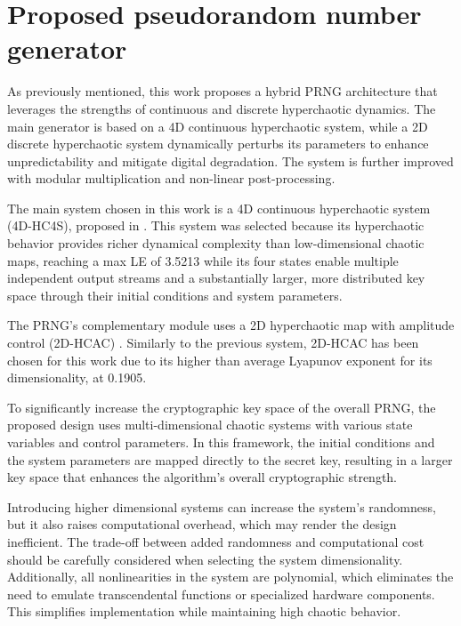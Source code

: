\documentclass[preprint, 12pt, sort&compress]{elsarticle}
\begin{document}
\section{Proposed pseudorandom number generator}\label{sec_3}
As previously mentioned, this work proposes a hybrid PRNG architecture that leverages the strengths of continuous and discrete hyperchaotic dynamics. The main generator is based on a 4D continuous hyperchaotic system, while a 2D discrete hyperchaotic system dynamically perturbs its parameters to enhance unpredictability and mitigate digital degradation. The system is further improved with modular multiplication and non-linear post-processing.

{\color{red}
The main system chosen in this work is a 4D continuous hyperchaotic system (4D-HC4S), proposed in \cite{vaidyanathan_new_2021}.
This system was selected because its hyperchaotic behavior provides richer dynamical complexity than low-dimensional chaotic maps, reaching a max LE of 3.5213 while its four states enable multiple independent output streams and a substantially larger, more distributed key space through their initial conditions and system parameters. 

The PRNG's complementary module uses a 2D hyperchaotic map with amplitude control (2D-HCAC) \cite{zhou_2d_2021}.
Similarly to the previous system, 2D-HCAC has been chosen for this work due to its higher than average Lyapunov exponent for its dimensionality, at 0.1905. 

To significantly increase the cryptographic key space of the overall PRNG, the proposed design uses multi-dimensional chaotic systems with various state variables and control parameters. In this framework, the initial conditions and the system parameters are mapped directly to the secret key, resulting in a larger key space that enhances the algorithm's overall cryptographic strength.

Introducing higher dimensional systems can increase the system’s randomness, but it also raises computational overhead, which may render the design inefficient. The trade-off between added randomness and computational cost should be carefully considered when selecting the system dimensionality. Additionally, all nonlinearities in the system are polynomial, which eliminates the need to emulate transcendental functions or specialized hardware components. This simplifies implementation while maintaining high chaotic behavior.
}
\end{document}
